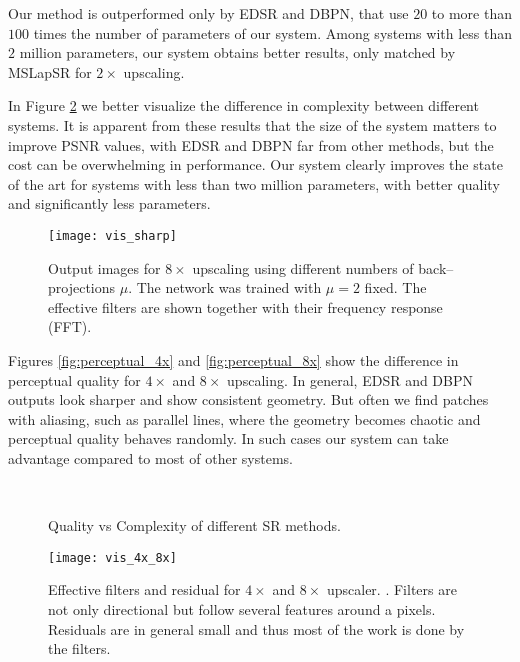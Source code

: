\documentclass[letterpaper]{article}
\begin{document}
Our method is outperformed only by EDSR and DBPN, that use $20$ to more than $100$ times the number of parameters of our system. Among systems with less than $2$ million parameters, our system obtains better results, only matched by MSLapSR for $2\times$ upscaling.

In Figure \ref{fig:scatter} we better visualize the difference in complexity between different systems. It is apparent from these results that the size of the system matters to improve PSNR values, with EDSR and DBPN far from other methods, but the cost can be overwhelming in performance. Our system clearly improves the state of the art for systems with less than two million parameters, with better quality and significantly less parameters.

\begin{figure}[h]
  \centering
  \texttt{[image: vis\_sharp]}
    \caption{Output images for $8\times$ upscaling using different numbers of back--projections $\mu$. The network was trained with $\mu=2$ fixed. The effective filters are shown together with their frequency response (FFT). \label{fig:vis_sharp}}
\end{figure}
Figures \ref{fig:perceptual_4x} and \ref{fig:perceptual_8x} show the difference in perceptual quality for $4\times$ and $8\times$ upscaling. In general, EDSR and DBPN outputs look sharper and show consistent geometry. But often we find patches with aliasing, such as parallel lines, where the geometry becomes chaotic and perceptual quality behaves randomly. In such cases our system can take advantage compared to most of other systems.
\begin{figure}[ht]
  \centering
   \label{fig:scatter_4x} \\
   \label{fig:scatter_8x}
    \caption{Quality vs Complexity of different SR methods. \label{fig:scatter}}
\end{figure}
\begin{figure*}[ht]
  \centering
  \texttt{[image: vis\_4x\_8x]}
    \caption{Effective filters and residual for $4\times$ and $8\times$ upscaler. \label{fig:vis_4x_8x}. Filters are not only directional but follow several features around a pixels. Residuals are in general small and thus most of the work is done by the filters.}
\end{figure*}
\end{document}
